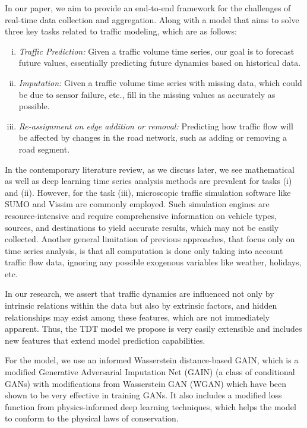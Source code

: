 In our paper, we aim to provide an end-to-end framework for the challenges of real-time data collection and aggregation. Along with a model that aims to solve three key tasks related to traffic modeling, which are as follows:
\begin{enumerate}[(i)]
    \item \textit{Traffic Prediction:} Given a traffic volume time series, our goal is to forecast future values, essentially predicting future dynamics based on historical data.
    
    \item \textit{Imputation:} Given a traffic volume time series with missing data, which could be due to sensor failure, etc., fill in the missing values as accurately as possible.
    
    \item \textit{Re-assignment on edge addition or removal:} Predicting how traffic flow will be affected by changes in the road network, such as adding or removing a road segment.
\end{enumerate}

In the contemporary literature review, as we discuss later, we see mathematical as well as deep learning time series analysis methods are prevalent for tasks (i) and (ii). However, for the task (iii), microscopic traffic simulation software like SUMO\cite{sumo} and Vissim\cite{vissim} are commonly employed. Such simulation engines are resource-intensive and require comprehensive information on vehicle types, sources, and destinations to yield accurate results, which may not be easily collected. Another general limitation of previous approaches, that focus only on time series analysis, is that all computation is done only taking into account traffic flow data, ignoring any possible exogenous variables like weather\cite{weather}, holidays\cite{holiday}, etc.

In our research, we assert that traffic dynamics are influenced not only by intrinsic relations within the data but also by extrinsic factors\cite{weather}\cite{holiday}, and hidden relationships may exist among these features, which are not immediately apparent. Thus, the TDT model we propose is very easily extensible and includes new features that extend model prediction capabilities.

For the model, we use an informed Wasserstein distance-based GAIN, which is a modified Generative Adversarial Imputation Net (GAIN)\cite{gain} (a class of conditional GANs) with modifications from Wasserstein GAN (WGAN)\cite{wgan} which have been shown to be very effective in training GANs\cite{wgan}. It also includes a modified loss function from physics-informed deep learning techniques\cite{pidl}, which helps the model to conform to the physical laws of conservation. 

